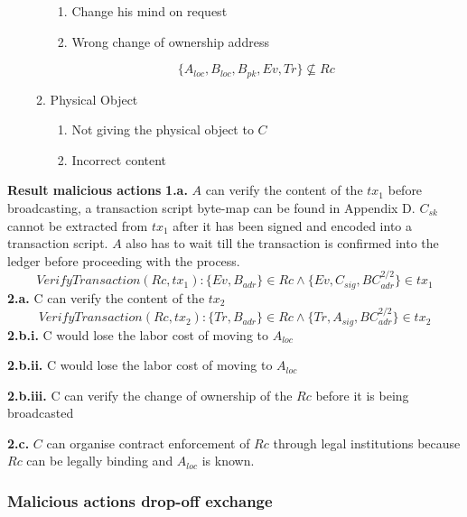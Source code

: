 \begin{enumerate}
\begin{enumerate}
\begin{enumerate}
      \item Change his mind on request
      \item Wrong change of ownership address
    \end{enumerate}
    \[\{A_{loc}, B_{loc}, B_{pk}, Ev, Tr\} \not\subseteq Rc\]
    \item Physical Object
    \begin{enumerate}
      \item Not giving the physical object to $C$
      \item Incorrect content
    \end{enumerate}
  \end{enumerate}
\end{enumerate}

\bigbreak
\noindent\textbf{Result malicious actions}
\bigbreak
\noindent\textbf{1.a.} $A$ can verify the content of the $tx_1$ before broadcasting, a transaction script byte-map can be found in Appendix D. $C_{sk}$ cannot be extracted from $tx_1$ after it has been signed and encoded into a transaction script. $A$ also has to wait till the transaction is confirmed into the ledger before proceeding with the process.
\[VerifyTransaction(Rc, tx_1)\colon \{Ev, B_{adr}\} \in Rc \land \{Ev, C_{sig},  BC_{adr}^{2/2}\} \in tx_1\]
\noindent\textbf{2.a.} C can verify the content of the $tx_2$
\[VerifyTransaction(Rc, tx_2)\colon\{Tr, B_{adr}\} \in Rc \land \{Tr, A_{sig}, BC_{adr}^{2/2}\} \in tx_2\]
\noindent\textbf{2.b.i.} C would lose the labor cost of moving to $A_{loc}$ \par
\noindent\textbf{2.b.ii.} C would lose the labor cost of moving to $A_{loc}$ \par
\noindent\textbf{2.b.iii.} C can verify the change of ownership of the $Rc$ before it is being broadcasted \par
\noindent\textbf{2.c.} $C$ can organise contract enforcement of $Rc$ through legal institutions because $Rc$ can be legally binding and $A_{loc}$ is known. \par

\subsubsection{Malicious actions drop-off exchange}

